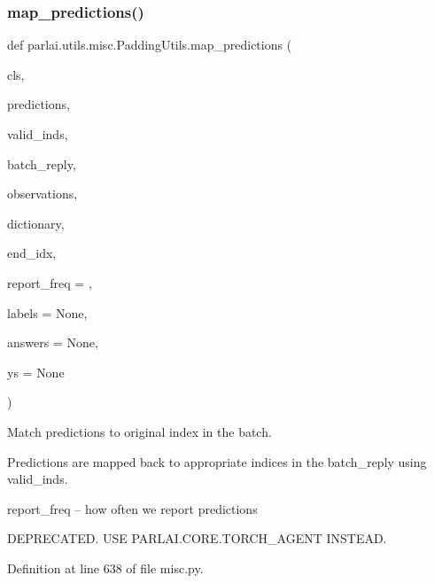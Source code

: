 \subsubsection{\texorpdfstring{map\+\_\+predictions()}{map\_predictions()}}
{\footnotesize\ttfamily def parlai.\+utils.\+misc.\+Padding\+Utils.\+map\+\_\+predictions (\begin{DoxyParamCaption}\item[{}]{cls,  }\item[{}]{predictions,  }\item[{}]{valid\+\_\+inds,  }\item[{}]{batch\+\_\+reply,  }\item[{}]{observations,  }\item[{}]{dictionary,  }\item[{}]{end\+\_\+idx,  }\item[{}]{report\+\_\+freq = {},  }\item[{}]{labels = {\ttfamily None},  }\item[{}]{answers = {\ttfamily None},  }\item[{}]{ys = {\ttfamily None} }\end{DoxyParamCaption})}

\begin{DoxyVerb}Match predictions to original index in the batch.

Predictions are mapped back to appropriate indices in the batch_reply
using valid_inds.

report_freq -- how often we report predictions

DEPRECATED. USE PARLAI.CORE.TORCH_AGENT INSTEAD.
\end{DoxyVerb}
 

Definition at line 638 of file misc.\+py.


